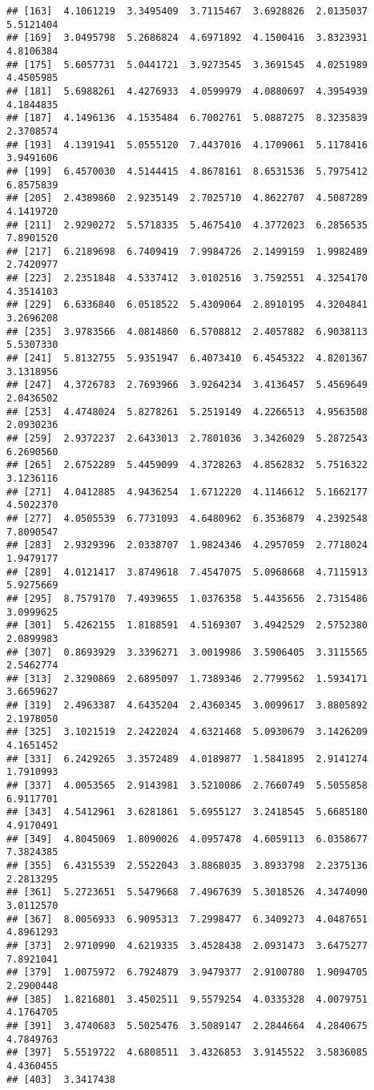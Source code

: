\documentclass[
]{article}
\begin{document}
\begin{verbatim}
## [163]  4.1061219  3.3495409  3.7115467  3.6928826  2.0135037  5.5121404
## [169]  3.0495798  5.2686824  4.6971892  4.1500416  3.8323931  4.8106384
## [175]  5.6057731  5.0441721  3.9273545  3.3691545  4.0251989  4.4505985
## [181]  5.6988261  4.4276933  4.0599979  4.0880697  4.3954939  4.1844835
## [187]  4.1496136  4.1535484  6.7002761  5.0887275  8.3235839  2.3708574
## [193]  4.1391941  5.0555120  7.4437016  4.1709061  5.1178416  3.9491606
## [199]  6.4570030  4.5144415  4.8678161  8.6531536  5.7975412  6.8575839
## [205]  2.4389860  2.9235149  2.7025710  4.8622707  4.5087289  4.1419720
## [211]  2.9290272  5.5718335  5.4675410  4.3772023  6.2856535  7.8901520
## [217]  6.2189698  6.7409419  7.9984726  2.1499159  1.9982489  2.7420977
## [223]  2.2351848  4.5337412  3.0102516  3.7592551  4.3254170  4.3514103
## [229]  6.6336840  6.0518522  5.4309064  2.8910195  4.3204841  3.2696208
## [235]  3.9783566  4.0814860  6.5708812  2.4057882  6.9038113  5.5307330
## [241]  5.8132755  5.9351947  6.4073410  6.4545322  4.8201367  3.1318956
## [247]  4.3726783  2.7693966  3.9264234  3.4136457  5.4569649  2.0436502
## [253]  4.4748024  5.8278261  5.2519149  4.2266513  4.9563508  2.0930236
## [259]  2.9372237  2.6433013  2.7801036  3.3426029  5.2872543  6.2690560
## [265]  2.6752289  5.4459099  4.3728263  4.8562832  5.7516322  3.1236116
## [271]  4.0412885  4.9436254  1.6712220  4.1146612  5.1662177  4.5022370
## [277]  4.0505539  6.7731093  4.6480962  6.3536879  4.2392548  7.8090547
## [283]  2.9329396  2.0338707  1.9824346  4.2957059  2.7718024  1.9479177
## [289]  4.0121417  3.8749618  7.4547075  5.0968668  4.7115913  5.9275669
## [295]  8.7579170  7.4939655  1.0376358  5.4435656  2.7315486  3.0999625
## [301]  5.4262155  1.8188591  4.5169307  3.4942529  2.5752380  2.0899983
## [307]  0.8693929  3.3396271  3.0019986  3.5906405  3.3115565  2.5462774
## [313]  2.3290869  2.6895097  1.7389346  2.7799562  1.5934171  3.6659627
## [319]  2.4963387  4.6435204  2.4360345  3.0099617  3.8805892  2.1978050
## [325]  3.1021519  2.2422024  4.6321468  5.0930679  3.1426209  4.1651452
## [331]  6.2429265  3.3572489  4.0189877  1.5841895  2.9141274  1.7910993
## [337]  4.0053565  2.9143981  3.5210086  2.7660749  5.5055858  6.9117701
## [343]  4.5412961  3.6281861  5.6955127  3.2418545  5.6685180  4.9170491
## [349]  4.8045069  1.8090026  4.0957478  4.6059113  6.0358677  7.3824385
## [355]  6.4315539  2.5522043  3.8868035  3.8933798  2.2375136  2.2813295
## [361]  5.2723651  5.5479668  7.4967639  5.3018526  4.3474090  3.0112570
## [367]  8.0056933  6.9095313  7.2998477  6.3409273  4.0487651  4.8961293
## [373]  2.9710990  4.6219335  3.4528438  2.0931473  3.6475277  7.8921041
## [379]  1.0075972  6.7924879  3.9479377  2.9100780  1.9094705  2.2900448
## [385]  1.8216801  3.4502511  9.5579254  4.0335328  4.0079751  4.1764705
## [391]  3.4740683  5.5025476  3.5089147  2.2844664  4.2840675  4.7849763
## [397]  5.5519722  4.6808511  3.4326853  3.9145522  3.5836085  4.4360455
## [403]  3.3417438
\end{verbatim}
\end{document}
